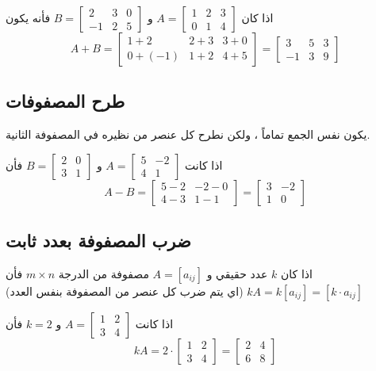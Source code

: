 	\begin{example}
		اذا كان 
		$A = 
		\begin{bmatrix}
			1&2&3\\
			0&1&4
		\end{bmatrix}
		$
		و
		$
		B=
		\begin{bmatrix}
			2&3&0\\
			-1&2&5
		\end{bmatrix}
		$
		فأنه يكون
		\[
		A+B=
		\begin{bmatrix}
			1+2&2+3&3+0\\
			0+(-1)&1+2&4+5
		\end{bmatrix}=
		\begin{bmatrix}
			3&5&3\\
			-1&3&9
		\end{bmatrix}
		\]
	\end{example}
	
	\subsection{طرح المصفوفات}
	يكون نفس الجمع تماماً ، ولكن نطرح كل عنصر من نظيره في المصفوفة الثانية.
	
	\begin{example}
		اذا كانت 
		$
		A=
		\begin{bmatrix}
			5&-2\\
			4&1
		\end{bmatrix}
		$
		و
		$
		B=
		\begin{bmatrix}
			2&0\\
			3&1
		\end{bmatrix}
		$
		فأن
		\[
		A-B=
		\begin{bmatrix}
			5-2&-2-0\\
			4-3&1-1
		\end{bmatrix}=
		\begin{bmatrix}
			3&-2\\
			1&0
		\end{bmatrix}
		\]
	\end{example}
	
	\subsection{ضرب المصفوفة بعدد ثابت}
	اذا كان $k$ عدد حقيقي و $A=[a_{ij}]$ مصفوفة من الدرجة $m\times n$ فأن
	$kA=k[a_{ij}]=[k\cdot a_{ij}]$ (اي يتم ضرب كل عنصر من المصفوفة بنفس العدد)
	
	\begin{example}
		اذا كانت 
		$A=
		\begin{bmatrix}
			1&2\\
			3&4
		\end{bmatrix}
		$
		و $k=2$ فأن
		\[
		kA= 2\cdot
		\begin{bmatrix}
			1&2\\
			3&4
		\end{bmatrix}
		=
		\begin{bmatrix}
			2&4\\
			6&8
		\end{bmatrix}
		\]
	\end{example}
	

